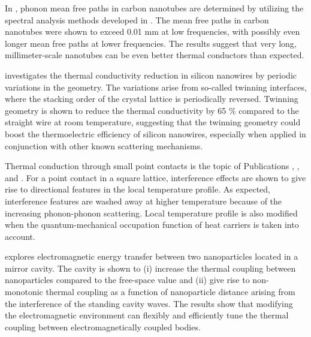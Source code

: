 In , phonon mean free paths in carbon nanotubes are determined by utilizing the spectral analysis methods developed in . The mean free paths in carbon nanotubes were shown to exceed 0.01 mm at low frequencies, with possibly even longer mean free paths at lower frequencies. The results suggest that very long, millimeter-scale nanotubes can be even better thermal conductors than expected. %
 
 investigates the thermal conductivity reduction in silicon nanowires by periodic variations in the geometry. The variations arise from so-called twinning interfaces, where the stacking order of the crystal lattice is periodically reversed. Twinning geometry is shown to reduce the thermal conductivity by 65 \% compared to the straight wire at room temperature, suggesting that the twinning geometry could boost the thermoelectric efficiency of silicon nanowires, especially when applied in conjunction with other known scattering mechanisms.

Thermal conduction through small point contacts is the topic of Publications , , and . For a point contact in a square lattice, interference effects are shown to give rise to directional features in the local temperature profile. As expected, interference features are washed away at higher temperature because of the increasing phonon-phonon scattering. Local temperature profile is also modified when the quantum-mechanical occupation function of heat carriers is taken into account. 

 explores electromagnetic energy transfer between two nanoparticles located in a mirror cavity. The cavity is shown to (i) increase the thermal coupling between nanoparticles compared to the free-space value and (ii) give rise to non-monotonic thermal coupling as a function of nanoparticle distance arising from the interference of the standing   cavity waves. The results show that modifying the electromagnetic environment can flexibly and efficiently tune the thermal coupling between electromagnetically coupled bodies.



